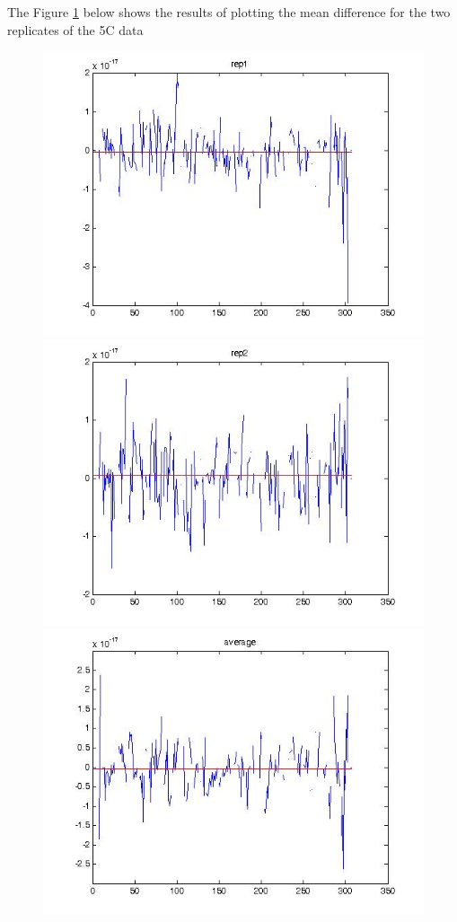 \documentclass[12pt]{paper}
\begin{document}
The Figure \ref{resultsOfFrequencyDifference} below shows the results of plotting the mean difference for the two replicates of the 5C data 
\begin{figure}[H]\label{resultsOfFrequencyDifference}
\includegraphics*[scale=0.3]{symmetryOfEncountersRep1.jpg}
\includegraphics*[scale=0.3]{symmetryOfEncountersRep2}
\includegraphics*[scale=0.3]{symmetryOfEncountersAverage}

\end{figure}
\end{document}
